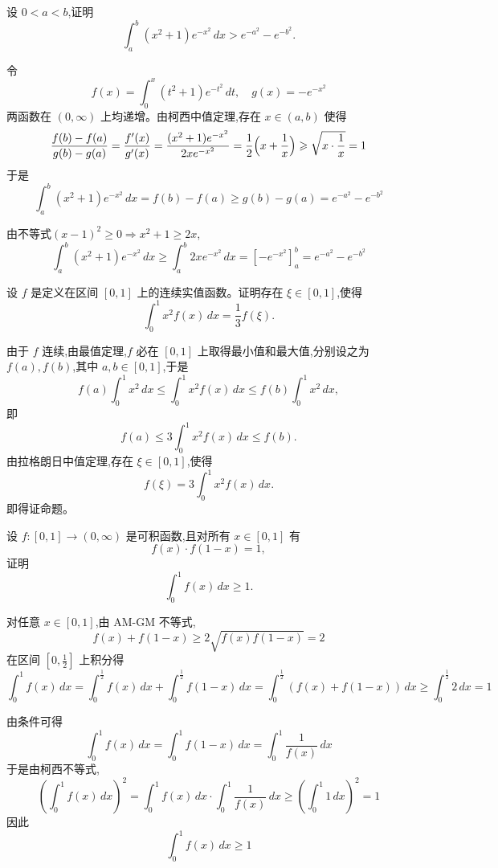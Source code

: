 \begin{questions}
    \question 设 $0 < a < b$,证明
    \[
    \int_a^b (x^2 + 1) e^{-x^2} \, dx > e^{-a^2} - e^{-b^2}.
    \]
    \begin{solution}
        令
        \[
        f(x) = \int_0^x (t^2 + 1) e^{-t^2} \, dt, \quad g(x) = - e^{-x^2}
        \]
        两函数在 $(0,\infty)$ 上均递增。由柯西中值定理,存在 $x \in (a,b)$ 使得
        \[
        \frac{f(b)-f(a)}{g(b)-g(a)} = \frac{f'(x)}{g'(x)} = \frac{(x^2+1)e^{-x^2}}{2 x e^{-x^2}} = \frac{1}{2}\Bigl(x + \frac{1}{x}\Bigr) \ge \sqrt{x \cdot \frac{1}{x}} = 1
        \]
        于是
        \[
        \int_a^b (x^2+1)e^{-x^2} \, dx = f(b)-f(a) \ge g(b)-g(a) = e^{-a^2} - e^{-b^2}
        \]
    \end{solution}
    \begin{solution}
        由不等式$(x-1)^2\ge 0 \Rightarrow x^2+1\ge 2x$,
        \[
        \int_a^b (x^2+1) e^{-x^2} \, dx \ge \int_a^b 2x e^{-x^2} \, dx = [-e^{-x^2}]_a^b = e^{-a^2} - e^{-b^2}
        \]
    \end{solution}

    \question 设 $f$ 是定义在区间 $[0,1]$ 上的连续实值函数。证明存在 $\xi \in [0,1]$,使得
    \[
    \int_{0}^{1} x^2 f(x) \, dx = \frac{1}{3} f(\xi).
    \]
    \begin{solution}
        由于 $f$ 连续,由最值定理,$f$ 必在 $[0,1]$ 上取得最小值和最大值,分别设之为 $f(a),f(b)$,其中 $a,b \in [0,1]$,于是
        \[
        f(a) \int_{0}^{1} x^2 \, dx \le \int_{0}^{1} x^2 f(x) \, dx \le f(b) \int_{0}^{1} x^2 \, dx,
        \]
        即
        \[
        f(a) \le 3 \int_{0}^{1} x^2 f(x) \, dx \le f(b).
        \]
        由拉格朗日中值定理,存在 $\xi \in [0,1]$,使得
        \[
        f(\xi) = 3 \int_{0}^{1} x^2 f(x) \, dx.
        \]
        即得证命题。
    \end{solution}

    \question 设 $f: [0,1] \to (0,\infty)$ 是可积函数,且对所有 $x \in [0,1]$ 有
    \[
    f(x)\cdot f(1-x) = 1,
    \]
    证明
    \[
    \int_0^1 f(x)\,dx \geq 1.
    \]
    \begin{solution}
        对任意 $x\in[0,1]$,由 AM-GM 不等式,
        \[
        f(x)+f(1-x) \geq 2\sqrt{f(x)f(1-x)} = 2
        \]
        在区间 $[0,\frac{1}{2}]$ 上积分得
        \[
        \int_0^1 f(x)\,dx = \int_0^{\frac{1}{2}} f(x)\,dx + \int_0^{\frac{1}{2}} f(1-x)\,dx = \int_0^{\frac{1}{2}} (f(x)+f(1-x))\,dx \geq \int_0^{\frac{1}{2}} 2\,dx = 1
        \]
    \end{solution}
    \begin{solution}
        由条件可得
        \[
        \int_0^1 f(x)\,dx = \int_0^1 f(1-x)\,dx = \int_0^1 \frac{1}{f(x)}\,dx
        \]
        于是由柯西不等式,
        \[
        \left(\int_0^1 f(x)\,dx\right)^2 = \int_0^1 f(x)\,dx \cdot \int_0^1 \frac{1}{f(x)}\,dx \geq \left(\int_0^1 1\,dx\right)^2 = 1
        \]
        因此
        \[
        \int_0^1 f(x)\,dx \geq 1
        \]
    \end{solution}


\end{questions}

